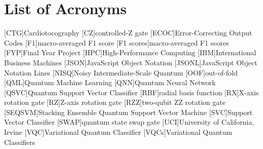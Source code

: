 \documentclass[]{UCD_CS_MSc_AAI_Report}
\begin{document}
\maketitle

\tableofcontents
\newpage

\chapter*{List of Acronyms}
\begin{acronym}[SEQSVM]
    [CTG]{Cardiotocography}
    [CZ]{controlled-Z gate}
    [ECOC]{Error-Correcting Output Codes}
    [F1]{macro-averaged F1 score}
    [F1 scores]{macro-averaged F1 scores}
    [FYP]{Final Year Project}
    [HPC]{High-Performance Computing}
    [IBM]{International Business Machines}
    [JSON]{JavaScript Object Notation}
    [JSONL]{JavaScript Object Notation Lines}
    [NISQ]{Noisy Intermediate-Scale Quantum}
    [OOF]{out-of-fold}
    [QML]{Quantum Machine Learning}
    [QNN]{Quantum Neural Network}
    [QSVC]{Quantum Support Vector Classifier}
    [RBF]{radial basis function}
    [RX]{X-axis rotation gate}
    [RZ]{Z-axis rotation gate}
    [RZZ]{two-qubit ZZ rotation gate}
    [SEQSVM]{Stacking Ensemble Quantum Support Vector Machine}
    [SVC]{Support Vector Classifier}
    [SWAP]{quantum state swap gate}
    [UCI]{University of California, Irvine}
    [VQC]{Variational Quantum Classifier}
    [VQCs]{Variational Quantum Classifiers}
\end{acronym}
\newpage
\printnoidxglossary[title={Glossary of Key Terms}]
\newpage
\acresetall

\abstract
\end{document}

